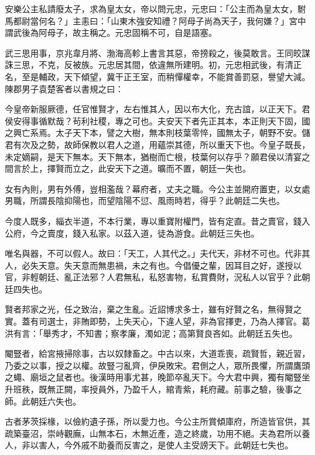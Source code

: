 \begin{pinyinscope}
 安樂公主私請廢太子，求為皇太女，帝以問元忠，元忠曰：「公主而為皇太女，駙馬都尉當何名？」主恚曰：「山東木強安知禮？阿母子尚為天子，我何嫌？」宮中謂武後為阿母子，故主稱之。元忠固稱不可，自是語塞。



 武三思用事，京兆韋月將、渤海高軫上書言其惡，帝搒殺之，後莫敢言。王同皎謀誅三思，不克，反被族。元忠居其間，依違無所建明。初，元忠相武後，有清正名，至是輔政，天下傾望，冀干正王室，而稍憚權幸，不能賞善罰惡，譽望大減。陳郡男子袁楚客者以書規之曰：



 今皇帝新服厥德，任官惟賢才，左右惟其人，因以布大化，充古誼，以正天下。君侯安得事循默哉？茍利社稷，專之可也。夫安天下者先正其本，本正則天下固，國之興亡系焉。太子天下本，譬之大樹，無本則枝葉零悴，國無太子，朝野不安。儲君有次及之勢，故師保教以君人之道，用蘊崇其德，所以重天下也。今皇子既長，未定嫡嗣，是天下無本。天下無本，猶樹而亡根，枝葉何以存乎？願君侯以清宴之間言於上，擇賢而立之，此安天下之道。曠而不置，朝廷一失也。



 女有內則，男有外傅，豈相濫哉？幕府者，丈夫之職。今公主並開府置吏，以女處男職，所謂長陰抑陽也，而望陰陽不愆、風雨時若，得乎？此朝廷二失也。



 今度人既多，緇衣半道，不本行業，專以重寶附權門，皆有定直。昔之賣官，錢入公府，今之賣度，錢入私家。以茲入道，徒為游食。此朝廷三失也。



 唯名與器，不可以假人。故曰：「天工，人其代之。」夫代天，非材不可也。代非其人，必失天意。失天意而無患禍，未之有也。今倡優之輩，因耳目之好，遂授以官，非輕朝廷、亂正法邪？人君無私，私怒害物，私賞費財，況私人以官乎？此朝廷四失也。



 賢者邦家之光，任之致治，棄之生亂。近詔博求多士，雖有好賢之名，無得賢之實。蓋有司選士，非賄即勢，上失天心，下違人望，非為官擇吏，乃為人擇官。葛洪有言：「舉秀才，不知書；察孝廉，濁如泥；高第賢良吝如。此朝廷五失也。



 閹豎者，給宮掖掃除事，古以奴隸畜之。中古以來，大道乖喪，疏賢哲，親近習，乃委之以事，授之以權。故豎刁亂齊，伊戾敗宋。君側之人，眾所畏懼，所謂鷹頭之蠅、廟垣之鼠者也。後漢時用事尤甚，晚節卒亂天下。今大君中興，獨有閹豎坐升班秩，既無正闕，率授員外，乃盈千人，綰青紫，耗府藏。前事之驗，後事之師。此朝廷六失也。



 古者茅茨採椽，以儉約遺子孫，所以愛力也。今公主所賞傾庫府，所造皆官供，其疏築臺沼，崇峙觀廡，山無本石，木無近產，造之終歲，功用不絕。夫為君所以養人，非以害人，今外戚不助養而反害之，是使人主受謗天下。此朝廷七失也。




\end{pinyinscope}
